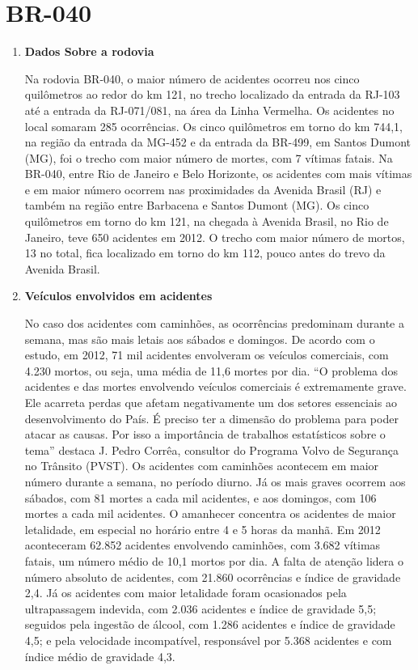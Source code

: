 \chapter[BR-040]{BR-040}

\begin{enumerate}
   \item \textbf{Dados Sobre a rodovia}

   Na rodovia BR-040, o maior número de acidentes ocorreu nos cinco quilômetros ao redor do km 121, no trecho localizado da entrada da RJ-103 até a entrada da RJ-071/081, \cite{pvst} na área da Linha Vermelha. Os acidentes no local somaram 285 ocorrências. Os cinco quilômetros em torno do km 744,1, na região da entrada da MG-452 e da entrada da BR-499, em Santos Dumont (MG), foi o trecho com maior número de mortes, com 7 vítimas fatais.
   Na BR-040, entre Rio de Janeiro e Belo Horizonte, os acidentes com mais vítimas e em maior número ocorrem nas proximidades da Avenida Brasil (RJ) e também na região entre Barbacena e Santos Dumont (MG). Os cinco quilômetros em torno do km 121, na chegada à Avenida Brasil, no Rio de Janeiro, teve 650 acidentes em 2012. O trecho com maior número de mortos, 13 no total, fica localizado em torno do km 112, pouco antes do trevo da Avenida Brasil.

   \item \textbf{Veículos envolvidos em acidentes}

   No caso dos acidentes com caminhões, as ocorrências predominam durante a semana, mas são mais letais aos sábados e domingos. De acordo com o estudo, em 2012, 71 mil acidentes envolveram os veículos comerciais, com 4.230 mortos, ou seja, uma média de 11,6 mortes por dia. “O problema dos acidentes e das mortes envolvendo veículos comerciais é extremamente grave. Ele acarreta perdas que afetam negativamente um dos setores essenciais ao desenvolvimento do País. É preciso ter a dimensão do problema para poder atacar as causas. Por isso a importância de trabalhos estatísticos sobre o tema” destaca J. Pedro Corrêa, consultor do Programa Volvo de Segurança no Trânsito (PVST).
   Os acidentes com caminhões acontecem em maior número durante a semana, no período diurno. Já os mais graves ocorrem aos sábados, com 81 mortes a cada mil acidentes, e aos domingos, com 106 mortes a cada mil acidentes. O amanhecer concentra os acidentes de maior letalidade, em especial no horário entre 4 e 5 horas da manhã.
   Em 2012 aconteceram 62.852 acidentes envolvendo caminhões, com 3.682 vítimas fatais, um número médio de 10,1 mortos por dia. \cite{gpt}
   A falta de atenção lidera o número absoluto de acidentes, com 21.860 ocorrências e índice de gravidade 2,4. Já os acidentes com maior letalidade foram ocasionados pela ultrapassagem indevida, com 2.036 acidentes e índice de gravidade 5,5; seguidos pela ingestão de álcool, com 1.286 acidentes e índice de gravidade 4,5; e pela velocidade incompatível, responsável por 5.368 acidentes e com índice médio de gravidade 4,3.


\end{enumerate}
